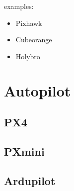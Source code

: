     examples:
    \begin{itemize}
        \item Pixhawk
        \item Cubeorange
        \item Holybro
    \end{itemize}

\section{Autopilot}
    \subsection{PX4}
        \subsection{PXmini}
    \subsection{Ardupilot}
